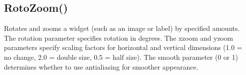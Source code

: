\documentclass[letterpaper,10pt,english]{sphinxmanual}
\begin{document}
\sphinxAtStartPar
{}

\begin{sphinxVerbatim}[commandchars=\\\{\}]
\end{sphinxVerbatim}

\sphinxAtStartPar
{}

\begin{sphinxVerbatim}[commandchars=\\\{\}]
\end{sphinxVerbatim}

\sphinxAtStartPar
{}

\sphinxAtStartPar
{}

\ignorespaces 

\subsection{RotoZoom()}
\label{\detokenize{reference/peblobjects:rotozoom}}\label{\detokenize{reference/peblobjects:index-41}}
\sphinxAtStartPar
{}

\sphinxAtStartPar
{}

\sphinxAtStartPar
Rotates and zooms a widget (such as an image or label) by specified amounts. The rotation parameter specifies rotation in degrees. The xzoom and yzoom parameters specify scaling factors for horizontal and vertical dimensions (1.0 = no change, 2.0 = double size, 0.5 = half size). The smooth parameter (0 or 1) determines whether to use anti\sphinxhyphen{}aliasing for smoother appearance.

\sphinxAtStartPar
{}

\begin{sphinxVerbatim}[commandchars=\\\{\}]
\end{sphinxVerbatim}
\end{document}
